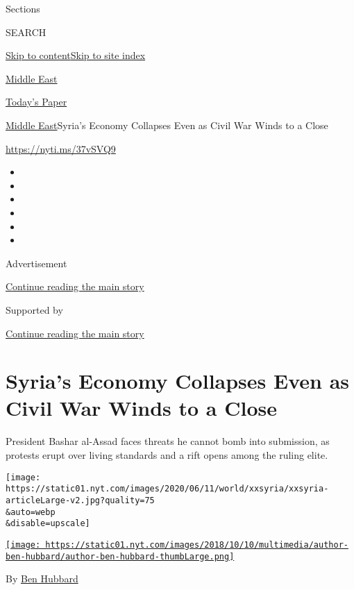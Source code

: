 Sections

SEARCH

\protect\hyperlink{site-content}{Skip to
content}\protect\hyperlink{site-index}{Skip to site index}

\href{https://www.nytimes.com/section/world/middleeast}{Middle East}

\href{https://myaccount.nytimes.com/auth/login?response_type=cookie\&client_id=vi}{}

\href{https://www.nytimes.com/section/todayspaper}{Today's Paper}

\href{/section/world/middleeast}{Middle East}\textbar{}Syria's Economy
Collapses Even as Civil War Winds to a Close

\url{https://nyti.ms/37vSVQ9}

\begin{itemize}
\item
\item
\item
\item
\item
\item
\end{itemize}

Advertisement

\protect\hyperlink{after-top}{Continue reading the main story}

Supported by

\protect\hyperlink{after-sponsor}{Continue reading the main story}

\hypertarget{syrias-economy-collapses-even-as-civil-war-winds-to-a-close}{%
\section{Syria's Economy Collapses Even as Civil War Winds to a
Close}\label{syrias-economy-collapses-even-as-civil-war-winds-to-a-close}}

President Bashar al-Assad faces threats he cannot bomb into submission,
as protests erupt over living standards and a rift opens among the
ruling elite.

\texttt{[image: https://static01.nyt.com/images/2020/06/11/world/xxsyria/xxsyria-articleLarge-v2.jpg?quality=75\\\&auto=webp\\\&disable=upscale]}

\href{https://www.nytimes.com/by/ben-hubbard}{\texttt{[image: https://static01.nyt.com/images/2018/10/10/multimedia/author-ben-hubbard/author-ben-hubbard-thumbLarge.png]}}

By \href{https://www.nytimes.com/by/ben-hubbard}{Ben Hubbard}

